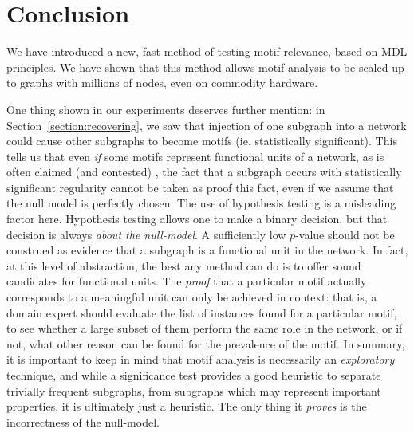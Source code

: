 \section{Conclusion} 

We have  introduced a new, fast method of testing motif relevance, based on MDL principles. We have shown that this method allows motif analysis to be scaled up to graphs with millions of nodes, even on commodity hardware. 

One thing shown in our experiments deserves further mention: in Section~\ref{section:recovering}, we saw that injection of one subgraph into a network could cause other subgraphs to become motifs (ie. statistically significant). This tells us that even \emph{if} some motifs represent functional units of a network, as is often claimed (and contested) \cite{milo2002network,konagurthu2008origin}, the fact that a subgraph occurs with statistically significant regularity cannot be taken as proof this fact, even if we assume that the null model is perfectly chosen. The use of hypothesis testing is a misleading factor here. Hypothesis testing allows one to make a binary decision, but that decision is always \emph{about the null-model}. A sufficiently low $p$-value should not be construed as evidence that a subgraph is a functional unit in the network. In fact, at this level of abstraction, the best any method can do is to offer sound candidates for functional units. The \emph{proof} that a particular motif actually corresponds to a meaningful unit can only be achieved in context: that is, a domain expert should evaluate the list of instances found for a particular motif, to see whether a large subset of them perform the same role in the network, or if not, what other reason can be found for the prevalence of the motif. In summary, it is important to keep in mind that motif analysis is necessarily an \emph{exploratory} technique, and while a significance test provides a good heuristic to separate trivially frequent subgraphs, from subgraphs which may represent important properties, it is ultimately just a heuristic. The only thing it \emph{proves} is the incorrectness of the null-model. 


